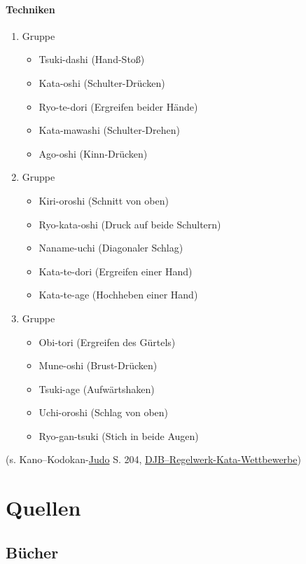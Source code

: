 \documentclass[justified, a4paper, notitlepage, captions=tableheading, nobib]{tufte-handout}
\begin{document}
\paragraph{Techniken}
\label{sec:orgecb118d}
\begin{enumerate}
\item Gruppe
\begin{itemize}
\item Tsuki-dashi (Hand-Stoß)
\item Kata-oshi (Schulter-Drücken)
\item Ryo-te-dori (Ergreifen beider Hände)
\item Kata-mawashi (Schulter-Drehen)
\item Ago-oshi (Kinn-Drücken)
\end{itemize}
\item Gruppe
\begin{itemize}
\item Kiri-oroshi (Schnitt von oben)
\item Ryo-kata-oshi (Druck auf beide Schultern)
\item Naname-uchi (Diagonaler Schlag)
\item Kata-te-dori (Ergreifen einer Hand)
\item Kata-te-age (Hochheben einer Hand)
\end{itemize}
\item Gruppe
\begin{itemize}
\item Obi-tori (Ergreifen des Gürtels)
\item Mune-oshi (Brust-Drücken)
\item Tsuki-age (Aufwärtshaken)
\item Uchi-oroshi (Schlag von oben)
\item Ryo-gan-tsuki (Stich in beide Augen)
\end{itemize}
\end{enumerate}

(s. Kano--Kodokan-\hyperref[org4f88021]{Judo} S. 204, \href{https://www.judobund.de/fileadmin/\_horusdam/897-DJB-Regelwerk\_Kata-Wettbewerbe-IJF2015.pdf}{DJB--Regelwerk-Kata-Wettbewerbe})

\newpage
\section{Quellen }
\label{sec:org8bc4ae4}

\subsection{Bücher}
\label{sec:org183b946}
\end{document}
